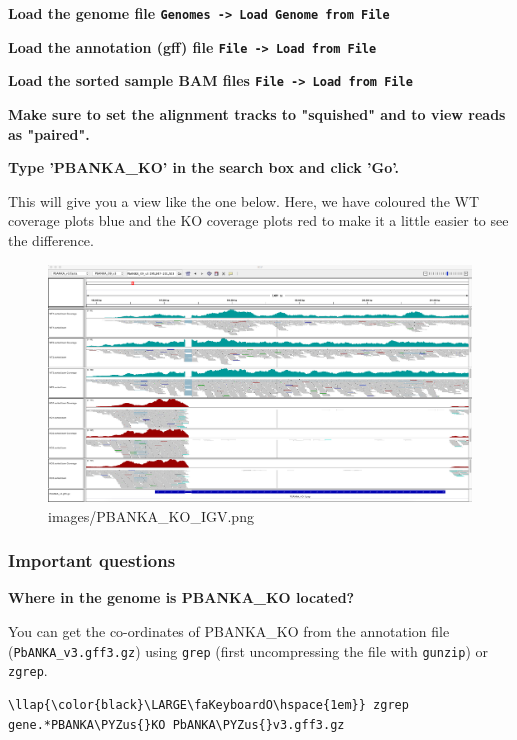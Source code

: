 \documentclass[11pt]{article}
\makeatletter
\def\maxwidth{\ifdim\Gin@nat@width>\linewidth\linewidth
    \else\Gin@nat@width\fi}
\let\Oldincludegraphics\includegraphics
\renewcommand{\includegraphics}[1]{\Oldincludegraphics[width=.8\maxwidth, height=.55\textheight, keepaspectratio]{#1}}
\def\PYZus{\char`\_}
\makeatother
\begin{document}
    \textbf{Load the genome file
\texttt{Genomes\ -\textgreater{}\ Load\ Genome\ from\ File}}

\textbf{Load the annotation (gff) file
\texttt{File\ -\textgreater{}\ Load\ from\ File}}

\textbf{Load the sorted sample BAM files
\texttt{File\ -\textgreater{}\ Load\ from\ File}}

\textbf{Make sure to set the alignment tracks to "squished" and to view
reads as "paired".}

\textbf{Type 'PBANKA\_KO' in the search box and click 'Go'.}

This will give you a view like the one below. Here, we have coloured the
WT coverage plots blue and the KO coverage plots red to make it a little
easier to see the difference.

    \begin{figure}[!h]
\centering
\includegraphics{images/PBANKA_KO_IGV.png}
\caption{images/PBANKA\_KO\_IGV.png}
\end{figure}

\newpage

    \subsubsection{Important questions}\label{important-questions}

\textbf{Where in the genome is PBANKA\_KO located?}

You can get the co-ordinates of PBANKA\_KO from the annotation file
(\texttt{PbANKA\_v3.gff3.gz}) using \texttt{grep} (first uncompressing
the file with \texttt{gunzip}) or \texttt{zgrep}.

\begin{terminalinput}
\begin{Verbatim}[commandchars=\\\{\}]
\llap{\color{black}\LARGE\faKeyboardO\hspace{1em}} zgrep gene.*PBANKA\PYZus{}KO PbANKA\PYZus{}v3.gff3.gz
\end{Verbatim}
\end{terminalinput}
\end{document}
